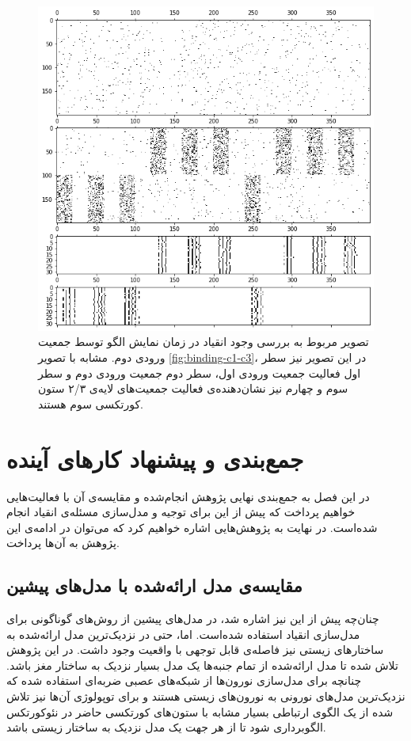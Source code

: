 \documentclass[12pt]{report}
\begin{document}
\begin{figure}[H]
	\centering
	\includegraphics[width=1.0\linewidth]{binding-c2-c3.png}
	\caption[NS]{
		تصویر مربوط به بررسی وجود انقیاد در زمان نمایش الگو توسط جمعیت ورودی دوم. مشابه با تصویر \ref{fig:binding-c1-c3}، در این تصویر نیز سطر اول فعالیت جمعیت ورودی اول، سطر دوم جمعیت ورودی دوم و سطر سوم و چهارم نیز نشان‌دهنده‌ی فعالیت جمعیت‌های لایه‌ی ۲/۳ ستون کورتکسی سوم هستند.
	}
	\label{fig:binding-c2-c3} 
\end{figure}

	
	
	\chapter{جمع‌بندی و پیشنهاد کار‌های آینده}
	در این فصل به جمع‌بندی نهایی پژوهش انجام‌شده و مقایسه‌ی آن با فعالیت‌هایی خواهیم پرداخت که پیش از این برای توجیه و مدل‌سازی مسئله‌ی انقیاد انجام شده‌است. در نهایت به پژوهش‌هایی اشاره خواهیم کرد که می‌توان در ادامه‌ی این پژوهش به آن‌ها پرداخت.
	
	\section{مقایسه‌ی مدل ارائه‌شده با مدل‌های پیشین}
	چنان‌چه پیش از این نیز اشاره شد، در مدل‌های پیشین از روش‌های گوناگونی برای مدل‌سازی انقیاد استفاده شده‌است. اما، حتی در نزدیک‌ترین مدل ارائه‌شده به ساختار‌های زیستی نیز فاصله‌ی قابل توجهی با واقعیت وجود داشت. در این پژوهش تلاش شده تا مدل ارائه‌شده از تمام جنبه‌ها یک مدل بسیار نزدیک به ساختار مغز باشد. چنانچه برای مدل‌سازی نورون‌ها از شبکه‌های عصبی ضربه‌ای استفاده شده که نزدیک‌ترین مدل‌های نورونی به نورون‌های زیستی هستند و برای توپولوژی آن‌ها نیز تلاش شده از یک الگوی ارتباطی بسیار مشابه با ستون‌های کورتکسی حاضر در نئوکورتکس الگوبرداری شود تا از هر جهت یک مدل نزدیک به ساختار زیستی باشد.
	
\end{document}
